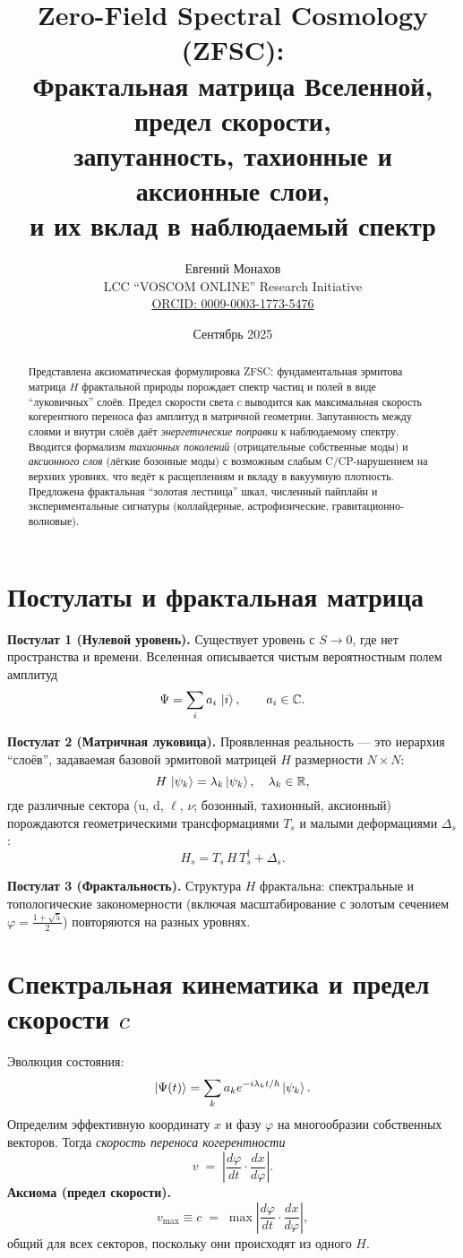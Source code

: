 \documentclass[12pt,a4paper]{article}
\title{Zero-Field Spectral Cosmology (ZFSC): \\
Фрактальная матрица Вселенной, предел скорости, \\
запутанность, тахионные и аксионные слои, \\
и их вклад в наблюдаемый спектр}
\author{Евгений Монахов \\ LCC ``VOSCOM ONLINE'' Research Initiative \\ \href{https://orcid.org/0009-0003-1773-5476}{ORCID: 0009-0003-1773-5476}}
\date{Сентябрь 2025}
\begin{document}
\maketitle

\begin{abstract}
Представлена аксиоматическая формулировка ZFSC: фундаментальная эрмитова матрица $H$ фрактальной природы порождает спектр частиц и полей в виде ``луковичных'' слоёв. Предел скорости света $c$ выводится как максимальная скорость когерентного переноса фаз амплитуд в матричной геометрии. Запутанность между слоями и внутри слоёв даёт \emph{энергетические поправки} к наблюдаемому спектру. Вводится формализм \emph{тахионных поколений} (отрицательные собственные моды) и \emph{аксионного слоя} (лёгкие бозонные моды) с возможным слабым C/CP-нарушением на верхних уровнях, что ведёт к расщеплениям и вкладу в вакуумную плотность. Предложена фрактальная ``золотая лестница'' шкал, численный пайплайн и экспериментальные сигнатуры (коллайдерные, астрофизические, гравитационно-волновые).
\end{abstract}

\section{Постулаты и фрактальная матрица}
\textbf{Постулат 1 (Нулевой уровень).} Существует уровень с $S\to 0$, где нет пространства и времени. Вселенная описывается чистым вероятностным полем амплитуд
\[
\Psi = \sum_i a_i \,\ket{i}, \qquad a_i\in\mathbb{C}.
\]

\textbf{Постулат 2 (Матричная луковица).} Проявленная реальность --- это иерархия ``слоёв'', задаваемая базовой эрмитовой матрицей $H$ размерности $N\times N$:
\[
H\,\ket{\psi_k}=\lambda_k \ket{\psi_k},\quad \lambda_k\in\mathbb{R},
\]
где различные сектора (u, d, $\ell$, $\nu$; бозонный, тахионный, аксионный) порождаются геометрическими трансформациями $T_s$ и малыми деформациями $\Delta_s$:
\[
H_s = T_s\,H\,T_s^\dagger + \Delta_s .
\]

\textbf{Постулат 3 (Фрактальность).} Структура $H$ фрактальна: спектральные и топологические закономерности (включая масштабирование с золотым сечением $\varphi=\frac{1+\sqrt{5}}{2}$) повторяются на разных уровнях.

\section{Спектральная кинематика и предел скорости $c$}
Эволюция состояния:
\[
\ket{\Psi(t)}=\sum_k a_k e^{-i\lambda_k t/\hbar}\ket{\psi_k}.
\]
Определим эффективную координату $x$ и фазу $\varphi$ на многообразии собственных векторов. Тогда \emph{скорость переноса когерентности}
\[
v \;=\; \left|\frac{d\varphi}{dt}\cdot \frac{dx}{d\varphi}\right|.
\]
\textbf{Аксиома (предел скорости).}
\[
v_{\max}\equiv c \;=\; \max \left|\frac{d\varphi}{dt}\cdot \frac{dx}{d\varphi}\right|,
\]
общий для всех секторов, поскольку они происходят из одного $H$.
\end{document}
